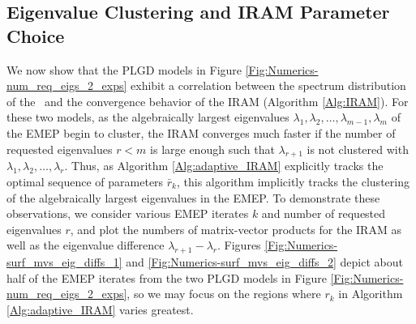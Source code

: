 \subsection{Eigenvalue Clustering and IRAM Parameter Choice}		\label{Subsubsec:evol_mats-correl_clustering_IRAM_param}




We now show that the PLGD models in Figure \ref{Fig:Numerics-num_req_eigs_2_exps} exhibit a correlation between the spectrum distribution of the \emep \ and the convergence behavior of the IRAM (Algorithm \ref{Alg:IRAM}).
For these two models, as the algebraically largest eigenvalues $\lambda_1, \lambda_2, \ldots, \lambda_{m-1}, \lambda_{m}$ of the EMEP begin to cluster, 
the IRAM converges much faster if the number of requested eigenvalues $r<m$ is large enough such that $\lambda_{r+1}$ is not clustered with $\lambda_1, \lambda_2, \ldots, \lambda_r$.
Thus, as Algorithm \ref{Alg:adaptive_IRAM} explicitly tracks the optimal sequence of parameters $\bar{r}_k$, this algorithm implicitly tracks the clustering of the algebraically largest eigenvalues in the EMEP.
To demonstrate these observations, we consider various EMEP iterates $k$ and number of requested eigenvalues $r$, and plot the numbers of matrix-vector products for the IRAM as well as the eigenvalue difference $\lambda_{r+1} - \lambda_r$.
Figures \ref{Fig:Numerics-surf_mvs_eig_diffs_1} and \ref{Fig:Numerics-surf_mvs_eig_diffs_2} depict about half of the EMEP iterates from the two PLGD models in Figure \ref{Fig:Numerics-num_req_eigs_2_exps}, so we may focus on the regions where $r_k$ in Algorithm \ref{Alg:adaptive_IRAM} varies greatest.





